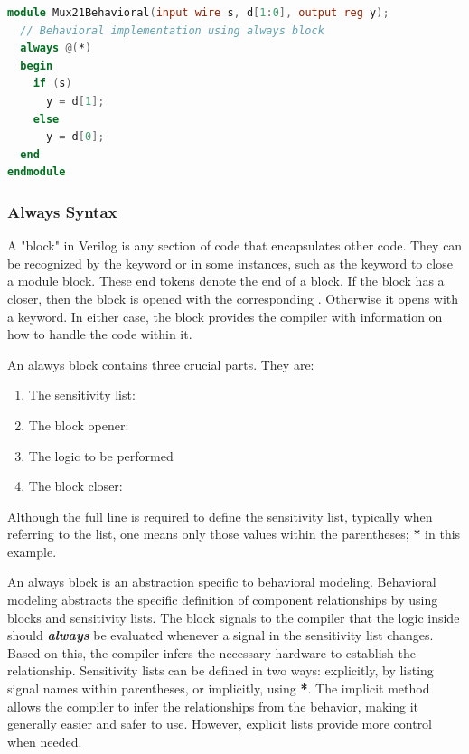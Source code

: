 \documentclass[12pt]{labmanual}
\begin{document}
\begin{lstlisting}[language=verilog]
module Mux21Behavioral(input wire s, d[1:0], output reg y);
  // Behavioral implementation using always block
  always @(*)
  begin
    if (s)
      y = d[1];
    else
      y = d[0];
  end
endmodule
\end{lstlisting}

\subsubsection{Always Syntax}
A "block" in Verilog is any section of code that encapsulates other code. They can be recognized by the keyword  or  in some instances, such as the keyword  to close a module block. These end tokens denote the end of a block. If the block has a  closer, then the block is opened with the corresponding . Otherwise it opens with a  keyword. In either case, the block provides the compiler with information on how to handle the code within it.


An alawys block contains three crucial parts. They are:

\begin{enumerate}
    \item The sensitivity list: 
    \item The block opener: 
    \item The logic to be performed 
    \item The block closer: 
\end{enumerate}

Although the full line  is required to define the sensitivity list, typically when referring to the list, one means only those values within the parentheses; \textbf{*} in this example.

An always block is an abstraction specific to behavioral modeling. Behavioral modeling abstracts the specific definition of component relationships by using  blocks and sensitivity lists. The  block signals to the compiler that the logic inside should \textbf{\textit{always}} be evaluated whenever a signal in the sensitivity list changes. Based on this, the compiler infers the necessary hardware to establish the relationship. Sensitivity lists can be defined in two ways: explicitly, by listing signal names within parentheses, or implicitly, using \textbf{*}. The implicit method allows the compiler to infer the relationships from the behavior, making it generally easier and safer to use. However, explicit lists provide more control when needed.
\end{document}
